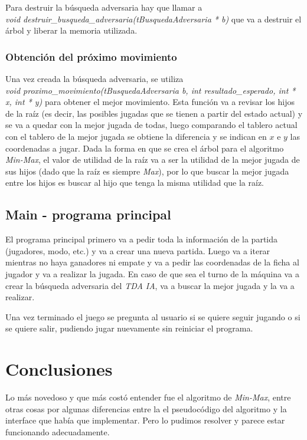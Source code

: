 \documentclass[12pt,a4paper]{article}
\begin{document}
Para destruir la b\'usqueda adversaria hay que llamar a \\\emph{void destruir\_busqueda\_adversaria(tBusquedaAdversaria * b)} que va a destruir el \'arbol y liberar la memoria utilizada.

\subsubsection{Obtenci\'on del pr\'oximo movimiento}
Una vez creada la b\'usqueda adversaria, se utiliza \\\emph{void proximo\_movimiento(tBusquedaAdversaria b, int resultado\_esperado, int * x, int * y)} para obtener el mejor movimiento. Esta funci\'on va a revisar los hijos de la ra\'iz (es decir, las posibles jugadas que se tienen a partir del estado actual) y se va a quedar con la mejor jugada de todas, luego comparando el tablero actual con el tablero de la mejor jugada se obtiene la diferencia y se indican en $x$ e $y$ las coordenadas a jugar. Dada la forma en que se crea el \'arbol para el algoritmo \emph{Min-Max}, el valor de utilidad de la ra\'iz va a ser la utilidad de la mejor jugada de sus hijos (dado que la ra\'iz es siempre \emph{Max}), por lo que buscar la mejor jugada entre los hijos es buscar al hijo que tenga la misma utilidad que la ra\'iz.

\subsection{Main - programa principal}
El programa principal primero va a pedir toda la informaci\'on de la partida (jugadores, modo, etc.) y va a crear una nueva partida. Luego va a iterar mientras no haya ganadores ni empate y va a pedir las coordenadas de la ficha al jugador y va a realizar la jugada. En caso de que sea el turno de la m\'aquina va a crear la b\'usqueda adversaria del \emph{TDA IA}, va a buscar la mejor jugada y la va a realizar.

Una vez terminado el juego se pregunta al usuario si se quiere seguir jugando o si se quiere salir, pudiendo jugar nuevamente sin reiniciar el programa.

\section{Conclusiones}
Lo m\'as novedoso y que m\'as cost\'o entender fue el algoritmo de \emph{Min-Max}, entre otras cosas por algunas diferencias entre la el pseudoc\'odigo del algoritmo y la interface que hab\'ia que implementar. Pero lo pudimos resolver y parece estar funcionando adecuadamente.
\end{document}
